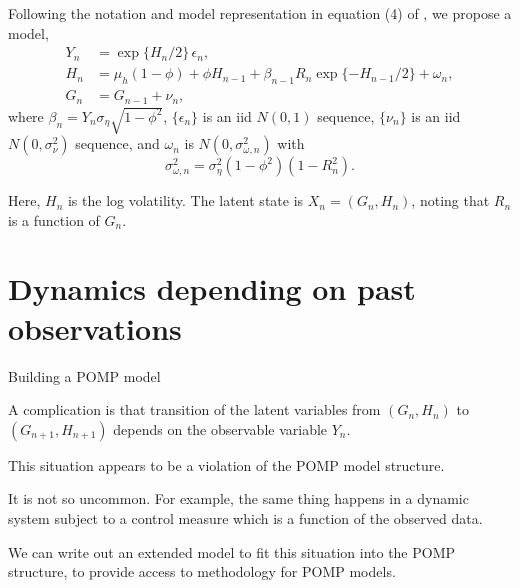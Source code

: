 \begin{frame}[fragile]

\bi

\item Following the notation and model representation in equation (4) of \citet{breto14}, we propose a model,
\begin{align} 
Y_n &= \exp\{H_n/2\} \, \epsilon_n, \\
H_n &= \mu_h(1-\phi) + \phi H_{n-1} +
\beta_{n-1}R_n\exp\{-H_{n-1}/2\} + \omega_n,\\
G_n &= G_{n-1}+\nu_n,
\end{align}
where $\beta_n=Y_n\sigma_\eta\sqrt{1-\phi^2}$, $\{\epsilon_n\}$ is an iid $N(0,1)$ sequence, $\{\nu_n\}$ is an iid $N(0,\sigma_{\nu}^2)$ sequence, and $\omega_n$ is $N(0,\sigma_{\omega,n}^2)$ with
\begin{equation}
\nonumber
\sigma^2_{\omega,n} = \sigma^2_{\eta}(1-\phi^2)(1-R_n^2).
\end{equation}
\item Here, $H_n$ is the log volatility. The latent state is $X_n=(G_n,H_n)$, noting that $R_n$ is a function of $G_n$.

\ei

\end{frame}

\section{Dynamics depending on past observations}

\begin{frame}[fragile]{Building a POMP model}

\vspace{-2mm}

\bi

\item A complication is that transition of the latent variables from $(G_n,H_n)$ to $(G_{n+1},H_{n+1})$ depends on the observable variable $Y_{n}$. 

\item This situation appears to be a violation of the POMP model structure.

\item It is not so uncommon. For example, the same thing happens in a dynamic system subject to a control measure which is a function of the observed data. 

\item We can write out an extended model to fit this situation into the POMP structure, to provide access to methodology for POMP models.

\ei

\end{frame}

